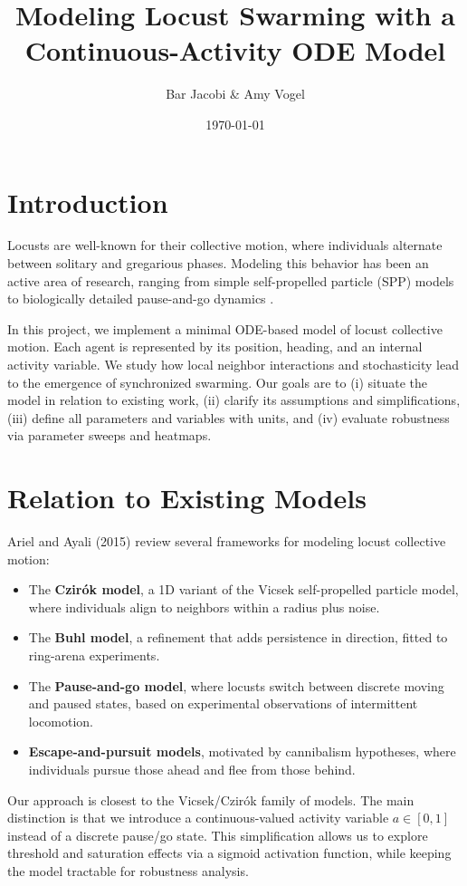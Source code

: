 \documentclass[11pt,a4paper]{article}
\title{Modeling Locust Swarming with a Continuous-Activity ODE Model}
\author{Bar Jacobi \& Amy Vogel}
\date{\today}
\begin{document}
\maketitle

\section{Introduction}

Locusts are well-known for their collective motion, where individuals alternate between solitary and gregarious phases. Modeling this behavior has been an active area of research, ranging from simple self-propelled particle (SPP) models to biologically detailed pause-and-go dynamics \cite{ariel2015locust}.  

In this project, we implement a minimal ODE-based model of locust collective motion. Each agent is represented by its position, heading, and an internal activity variable. We study how local neighbor interactions and stochasticity lead to the emergence of synchronized swarming. Our goals are to (i) situate the model in relation to existing work, (ii) clarify its assumptions and simplifications, (iii) define all parameters and variables with units, and (iv) evaluate robustness via parameter sweeps and heatmaps.

\section{Relation to Existing Models}

Ariel and Ayali (2015) review several frameworks for modeling locust collective motion:
\begin{itemize}
    \item The \textbf{Czirók model}, a 1D variant of the Vicsek self-propelled particle model, where individuals align to neighbors within a radius plus noise.
    \item The \textbf{Buhl model}, a refinement that adds persistence in direction, fitted to ring-arena experiments.
    \item The \textbf{Pause-and-go model}, where locusts switch between discrete moving and paused states, based on experimental observations of intermittent locomotion.
    \item \textbf{Escape-and-pursuit models}, motivated by cannibalism hypotheses, where individuals pursue those ahead and flee from those behind.
\end{itemize}

Our approach is closest to the Vicsek/Czirók family of models. The main distinction is that we introduce a continuous-valued activity variable $a \in [0,1]$ instead of a discrete pause/go state. This simplification allows us to explore threshold and saturation effects via a sigmoid activation function, while keeping the model tractable for robustness analysis.
\end{document}
